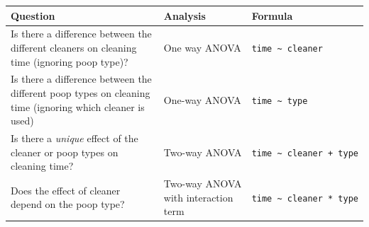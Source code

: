 \documentclass[]{book}
\theoremstyle{definition}
\theoremstyle{definition}
\theoremstyle{remark}
\begin{document}
\begin{longtable}[]{@{}lll@{}}
\toprule
\begin{minipage}[b]{0.47\columnwidth}\raggedright\strut
Question\strut
\end{minipage} & \begin{minipage}[b]{0.19\columnwidth}\raggedright\strut
Analysis\strut
\end{minipage} & \begin{minipage}[b]{0.25\columnwidth}\raggedright\strut
Formula\strut
\end{minipage}\tabularnewline
\midrule
\endhead
\begin{minipage}[t]{0.47\columnwidth}\raggedright\strut
Is there a difference between the different cleaners on cleaning time
(ignoring poop type)?\strut
\end{minipage} & \begin{minipage}[t]{0.19\columnwidth}\raggedright\strut
One way ANOVA\strut
\end{minipage} & \begin{minipage}[t]{0.25\columnwidth}\raggedright\strut
\texttt{time\ \textasciitilde{}\ cleaner}\strut
\end{minipage}\tabularnewline
\begin{minipage}[t]{0.47\columnwidth}\raggedright\strut
Is there a difference between the different poop types on cleaning time
(ignoring which cleaner is used)\strut
\end{minipage} & \begin{minipage}[t]{0.19\columnwidth}\raggedright\strut
One-way ANOVA\strut
\end{minipage} & \begin{minipage}[t]{0.25\columnwidth}\raggedright\strut
\texttt{time\ \textasciitilde{}\ type}\strut
\end{minipage}\tabularnewline
\begin{minipage}[t]{0.47\columnwidth}\raggedright\strut
Is there a \emph{unique} effect of the cleaner or poop types on cleaning
time?\strut
\end{minipage} & \begin{minipage}[t]{0.19\columnwidth}\raggedright\strut
Two-way ANOVA\strut
\end{minipage} & \begin{minipage}[t]{0.25\columnwidth}\raggedright\strut
\texttt{time\ \textasciitilde{}\ cleaner\ +\ type}\strut
\end{minipage}\tabularnewline
\begin{minipage}[t]{0.47\columnwidth}\raggedright\strut
Does the effect of cleaner depend on the poop type?\strut
\end{minipage} & \begin{minipage}[t]{0.19\columnwidth}\raggedright\strut
Two-way ANOVA with interaction term\strut
\end{minipage} & \begin{minipage}[t]{0.25\columnwidth}\raggedright\strut
\texttt{time\ \textasciitilde{}\ cleaner\ *\ type}\strut
\end{minipage}\tabularnewline
\bottomrule
\end{longtable}
\end{document}
